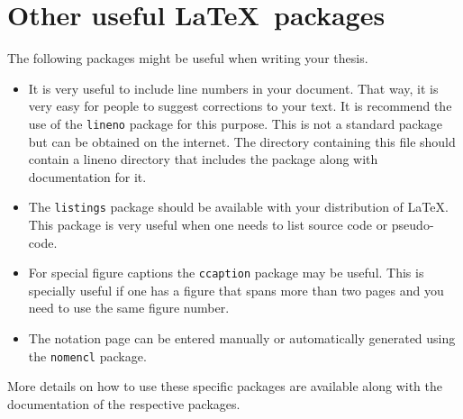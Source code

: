 \section{Other useful \LaTeX\ packages}

The following packages might be useful when writing your thesis.

\begin{itemize}  
\item It is very useful to include line numbers in your document.
  That way, it is very easy for people to suggest corrections to your
  text.  It is recommend the use of the \texttt{lineno} package for this
  purpose.  This is not a standard package but can be obtained on the
  internet.  The directory containing this file should contain a
  lineno directory that includes the package along with documentation
  for it.

\item The \texttt{listings} package should be available with your
  distribution of \LaTeX.  This package is very useful when one needs
  to list source code or pseudo-code.

\item For special figure captions the \texttt{ccaption} package may be
  useful.  This is specially useful if one has a figure that spans
  more than two pages and you need to use the same figure number.

\item The notation page can be entered manually or automatically
  generated using the \texttt{nomencl} package.

\end{itemize}

More details on how to use these specific packages are available along
with the documentation of the respective packages.
